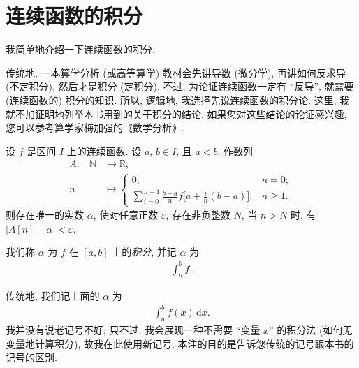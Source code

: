 \section{连续函数的积分}

我简单地介绍一下连续函数的积分.

传统地, 一本算学分析 (或高等算学) 教材会先讲导数 (微分学), 再讲如何反求导 (不定积分), 然后才是积分 (定积分). 不过, 为论证连续函数一定有 ``反导'', 就需要 (连续函数的) 积分的知识. 所以, 逻辑地, 我选择先说连续函数的积分论. 这里, 我就不加证明地列举本书用到的关于积分的结论. 如果您对这些结论的论证感兴趣, 您可以参考算学家梅加强的《数学分析》.

\begin{theorem}
    设 $f$ 是区间 $I$ 上的连续函数. 设 $a$, $b \in I$, 且 $a < b$. 作数列
    \begin{align*}
        \text{$A$:} \quad
        \mathbb{N} & \to \mathbb{R},                                                                                                        \\
        n          & \mapsto \begin{cases}
                                 0,                                                                                             & n = 0;    \\
                                 {\displaystyle \sum_{i = 0}^{n - 1} {\frac{b - a}{n} f\bigg[ a + \frac{i}{n} (b - a) \bigg]}}, & n \geq 1.
                             \end{cases}
    \end{align*}
    则存在唯一的实数 $\alpha$, 使对任意正数 $\varepsilon$, 存在非负整数 $N$, 当 $n > N$ 时, 有 $|A[n] - \alpha| < \varepsilon$.

    我们称 $\alpha$ 为 $f$ 在 $[a, b]$ 上的\emph{积分}, 并记 $\alpha$ 为
    \begin{align*}
        \int_{a}^{b} {f}.
    \end{align*}
\end{theorem}

\begin{remark}
    传统地, 我们记上面的 $\alpha$ 为
    \begin{align*}
        \int_{a}^{b} {f(x) \,\mathrm{d}x}.
    \end{align*}
    我并没有说老记号不好; 只不过, 我会展现一种不需要 ``变量 $x$'' 的积分法 (如何无变量地计算积分), 故我在此使用新记号. 本注的目的是告诉您传统的记号跟本书的记号的区别.
\end{remark}

